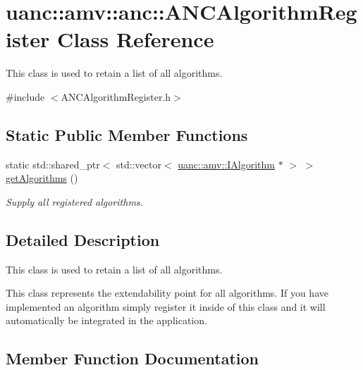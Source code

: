 \hypertarget{classuanc_1_1amv_1_1anc_1_1_a_n_c_algorithm_register}{}\section{uanc\+:\+:amv\+:\+:anc\+:\+:A\+N\+C\+Algorithm\+Register Class Reference}
\label{classuanc_1_1amv_1_1anc_1_1_a_n_c_algorithm_register}


This class is used to retain a list of all algorithms.  




{\ttfamily \#include $<$A\+N\+C\+Algorithm\+Register.\+h$>$}

\subsection*{Static Public Member Functions}
\begin{DoxyCompactItemize}
\item 
static std\+::shared\+\_\+ptr$<$ std\+::vector$<$ \hyperlink{classuanc_1_1amv_1_1_i_algorithm}{uanc\+::amv\+::\+I\+Algorithm} $\ast$ $>$ $>$ \hyperlink{classuanc_1_1amv_1_1anc_1_1_a_n_c_algorithm_register_ad3df250b009b0d6564fcfc8872e21356}{get\+Algorithms} ()
\begin{DoxyCompactList}\small\item\em Supply all registered algorithms. \end{DoxyCompactList}\end{DoxyCompactItemize}


\subsection{Detailed Description}
This class is used to retain a list of all algorithms. 

This class represents the extendability point for all algorithms. If you have implemented an algorithm simply register it inside of this class and it will automatically be integrated in the application. 

\subsection{Member Function Documentation}

